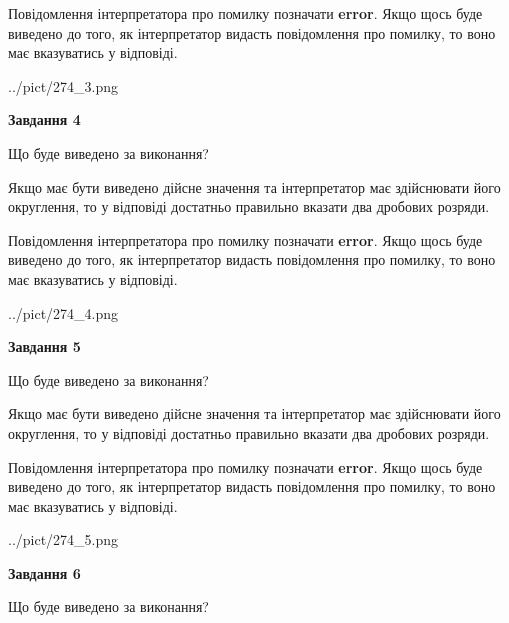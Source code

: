 \documentclass[12pt, ukrainian]{article}
\begin{document}
{\begin {Large}
Повідомлення інтерпретатора про помилку позначати \textbf{error}.
Якщо щось буде виведено до того, як інтерпретатор видасть повідомлення про помилку, 
то воно має вказуватись у відповіді. \par

\begin{center}
	{../pict/274_3.png}
\end{center}
\newpage

{\begin {center}\textbf{Завдання 4}\end {center}}\par
Що буде виведено за виконання? \par

Якщо має бути виведено дійсне значення та інтерпретатор має здійснювати його округлення, 
то у відповіді достатньо правильно вказати два дробових розряди.

Повідомлення інтерпретатора про помилку позначати \textbf{error}.
Якщо щось буде виведено до того, як інтерпретатор видасть повідомлення про помилку, 
то воно має вказуватись у відповіді. \par

\begin{center}
	{../pict/274_4.png}
\end{center}
\newpage

{\begin {center}\textbf{Завдання 5}\end {center}}\par
Що буде виведено за виконання? \par

Якщо має бути виведено дійсне значення та інтерпретатор має здійснювати його округлення, 
то у відповіді достатньо правильно вказати два дробових розряди.

Повідомлення інтерпретатора про помилку позначати \textbf{error}.
Якщо щось буде виведено до того, як інтерпретатор видасть повідомлення про помилку, 
то воно має вказуватись у відповіді. \par

\begin{center}
	{../pict/274_5.png}
\end{center}
\newpage

{\begin {center}\textbf{Завдання 6}\end {center}}\par
Що буде виведено за виконання? \par


\end{Large}}
\end{document}
